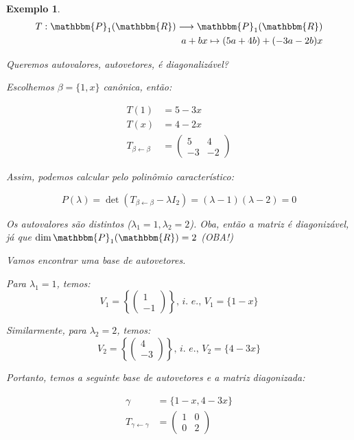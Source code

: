 \documentclass{article}
\newcommand{\REAL} {\mathbbm{R}}
\newcommand{\POL}[1] {\mathbbm{P}_{#1} (\REAL)}
\newcommand{\deffunc}[3] {#1: #2 \longrightarrow #3}
\newcommand{\mudabase}[3] {#1_{#2 \leftarrow #3}}
\newcommand{\vetord}[2] {\begin{pmatrix}#1\\#2\end{pmatrix}} %
\newcommand{\matriz}[4] {\begin{pmatrix}#1&#2\\#3&#4\end{pmatrix}}
\newtheorem{example}{Exemplo}[section]
\begin{document}
        \begin{example}
            \begin{align*}
                \deffunc{T}{\POL{1}}{\POL{1}}\\
                a + bx \mapsto (5a + 4b) + (-3a -2b)x
            \end{align*}
            
            Queremos autovalores, autovetores, é diagonalizável?

            Escolhemos $\beta = \{1, x\}$ canônica, então:

            \begin{align*}
                T(1) &= 5 - 3x\\
                T(x) &= 4 - 2x\\
                \mudabase{T}{\beta}{\beta} &= \matriz{5}{4}{-3}{-2}
            \end{align*}

            Assim, podemos calcular pelo polinômio característico:

            \[
                P(\lambda) = \det{(\mudabase{T}{\beta}{\beta} - \lambda I_2)} = (\lambda - 1)(\lambda - 2) = 0
            \]

            Os autovalores são distintos ($\lambda_1 = 1, \lambda_2 = 2$). Oba, então a matriz é diagonizável, já que
            $\dim{\POL{1}} = 2$ (OBA!)

            Vamos encontrar uma base de autovetores.

            Para $\lambda_1 = 1$, temos:
            \[
                V_1 = \left\{ \vetord{1}{-1} \right\} \textit{, i. e., } V_1 = \{1 - x\}
            \]

            Similarmente, para $\lambda_2 = 2$, temos:
            \[
                V_2 = \left\{ \vetord{4}{-3} \right\} \textit{, i. e., } V_2 = \{4 - 3x\}
            \]

            Portanto, temos a seguinte base de autovetores e a matriz diagonizada:

            \begin{align*}
                \gamma &= \{ 1 - x, 4 - 3x \}\\
                \mudabase{T}{\gamma}{\gamma} &= \matriz{1}{0}{0}{2}
            \end{align*}
        \end{example}
\end{document}
